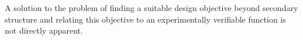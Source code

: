 \documentclass[../../master.tex]{subfiles}
\begin{document}
A solution to the problem of finding a suitable design objective beyond secondary structure and relating this objective to an experimentally verifiable function is not directly apparent.



\end{document}
